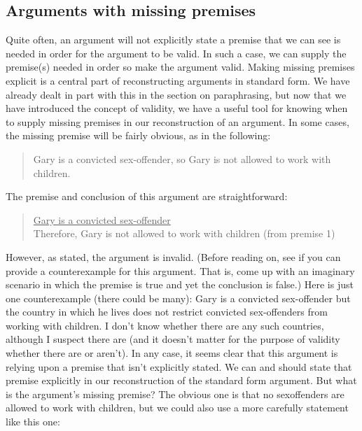 
\subsection{Arguments with missing premises}
Quite often, an argument will not explicitly state a premise that we can see is
needed in order for the argument to be valid. In such a case, we can supply the
premise(s) needed in order so make the argument valid. Making missing
premises explicit is a central part of reconstructing arguments in standard form.
We have already dealt in part with this in the section on paraphrasing, but now
that we have introduced the concept of validity, we have a useful tool for
knowing when to supply missing premises in our reconstruction of an argument.
In some cases, the missing premise will be fairly obvious, as in the following:

\begin{quote}
Gary is a convicted sex-offender, so Gary is not allowed to work with
children.
\end{quote}

The premise and conclusion of this argument are straightforward:

\begin{quote}
\underline{Gary is a convicted sex-offender} \\
Therefore, Gary is not allowed to work with children (from premise 1) \\
\end{quote}

However, as stated, the argument is invalid. (Before reading on, see if you can
provide a counterexample for this argument. That is, come up with an imaginary
scenario in which the premise is true and yet the conclusion is false.) Here is just
one counterexample (there could be many): Gary is a convicted sex-offender but
the country in which he lives does not restrict convicted sex-offenders from
working with children. I don't know whether there are any such countries,
although I suspect there are (and it doesn't matter for the purpose of validity
whether there are or aren't). In any case, it seems clear that this argument is
relying upon a premise that isn't explicitly stated. We can and should state that
premise explicitly in our reconstruction of the standard form argument. But
what is the argument's missing premise? The obvious one is that no sexoffenders are allowed to work with children, but we could also use a more
carefully statement like this one:

